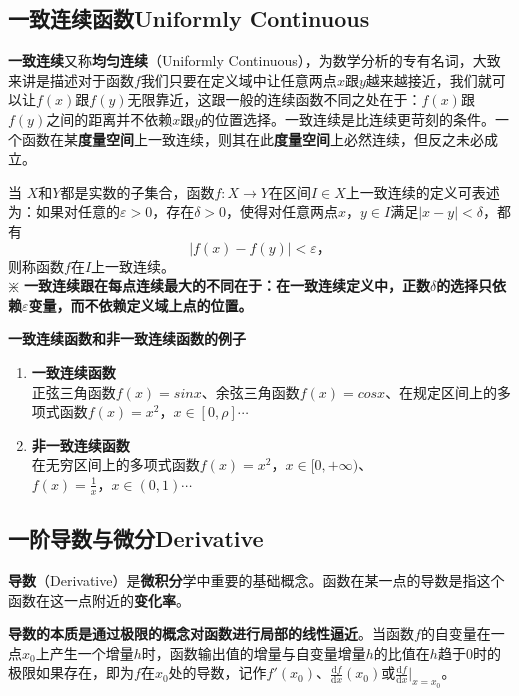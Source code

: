 \documentclass[UTF8]{ctexart}
\begin{document}
{\subsection{一致连续函数Uniformly Continuous}
\textbf{一致连续}又称\textbf{均匀连续}（Uniformly Continuous），为数学分析的专有名词，大致来讲是描述对于函数$f$我们只要在定义域中让任意两点$x$跟$y$越来越接近，我们就可以让$f(x)$跟$f(y)$无限靠近，这跟一般的连续函数不同之处在于：$f(x)$跟$f(y)$之间的距离并不依赖$x$跟$y$的位置选择。一致连续是比连续更苛刻的条件。一个函数在某\textbf{度量空间}上一致连续，则其在此\textbf{度量空间}上必然连续，但反之未必成立。

\begin{question}
	当 $X$和$Y$都是实数的子集合，函数$f:X\to Y$在区间$I \in X$上一致连续的定义可表述为：如果对任意的$\varepsilon >0$，存在$\delta >0$，使得对任意两点$x\text{，}y \in I$满足$|x-y|<\delta$，都有
\begin{equation}
	|f(x)-f(y)|<\varepsilon \text{，}
\end{equation}
则称函数$f$在$I$上一致连续。\\
$\divideontimes$ \textbf{一致连续跟在每点连续最大的不同在于：在一致连续定义中，正数$\delta$的选择只依赖$\varepsilon$变量，而不依赖定义域上点的位置。}
\end{question}

\begin{info}[Notice:]\textbf{一致连续函数和非一致连续函数的例子}
\begin{enumerate}
	\item \textbf{一致连续函数}\\
		正弦三角函数$f(x)=sinx$、余弦三角函数$f(x)=cosx$、在规定区间上的多项式函数$f(x)=x^2\text{，}x \in [0, \rho] \cdots$ 
	\item \textbf{非一致连续函数}\\
		在无穷区间上的多项式函数$f(x)=x^2\text{，}x \in [0, +\infty)$、$f(x)=\frac{1}{x}\text{，}x \in (0, 1) \cdots$
\end{enumerate}
\end{info}
\subsection{一阶导数与微分Derivative}
	\textbf{导数}（Derivative）是\textbf{微积分}学中重要的基础概念。函数在某一点的导数是指这个函数在这一点附近的\textbf{变化率}。
	
	\textbf{导数的本质是通过极限的概念对函数进行局部的线性逼近}。当函数$f$的自变量在一点$x_0$上产生一个增量$h$时，函数输出值的增量与自变量增量$h$的比值在$h$趋于0时的极限如果存在，即为$f$在$x_0$处的导数，记作$f'(x_0)$、$\frac{\mathrm{d}f}{\mathrm{d}x}(x_0)$或$ \frac{\mathrm {d} f}{\mathrm {d} x}|_{x=x_0}$。
	
}
\end{document}

